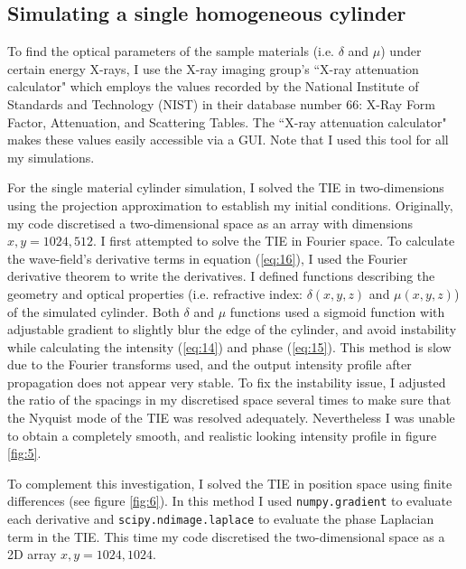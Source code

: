 \documentclass[10pt, a4paper, singlespacing]{report}
\begin{document}
\subsection{Simulating a single homogeneous cylinder}\label{Single cylinder}
To find the optical parameters of the sample materials (i.e. $\delta$ and $\mu$) under certain energy X-rays, I use the X-ray imaging group's ``X-ray attenuation calculator" which employs the values recorded by the National Institute of Standards and Technology (NIST) in their database number 66: X-Ray Form Factor, Attenuation, and Scattering Tables\cite{NIST}. The ``X-ray attenuation calculator" makes these values easily accessible via a GUI. Note that I used this tool for all my simulations.

For the single material cylinder simulation, I solved the TIE in two-dimensions using the projection approximation to establish my initial conditions.  Originally, my code discretised a two-dimensional space as an array with dimensions $x, y = 1024, 512$. I first attempted to solve the TIE in Fourier space. To calculate the wave-field's derivative terms in equation (\ref{eq:16}), I used the Fourier derivative theorem to write the derivatives. I defined functions describing the geometry and optical properties (i.e. refractive index: $\delta(x, y, z)$ and $\mu(x, y, z)$) of the simulated cylinder. Both $\delta$ and $\mu$ functions used a sigmoid function with adjustable gradient to slightly blur the edge of the cylinder, and avoid instability while calculating the intensity (\ref{eq:14}) and phase (\ref{eq:15}). This method is slow due to the Fourier transforms used, and the output intensity profile after propagation does not appear very stable. To fix the instability issue, I adjusted the ratio of the spacings in my discretised space several times to make sure that the Nyquist mode of the TIE was resolved adequately. Nevertheless I was unable to obtain a completely smooth, and realistic looking intensity profile in figure \ref{fig:5}.

To complement this investigation, I solved the TIE in position space using finite differences (see figure \ref{fig:6}). In this method I used \texttt{numpy.gradient} to evaluate each derivative and \texttt{scipy.ndimage.laplace} to evaluate the phase Laplacian term in the TIE. This time my code discretised the two-dimensional space as a 2D array $x, y = 1024, 1024$. 
\end{document}
